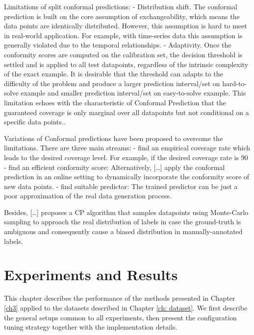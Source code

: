 \documentclass[a4paper,oneside,bibliography=totoc]{scrbook}
\begin{document}
Limitations of split conformal predictions:
- Distribution shift. The conformal prediction is built on the core assumption of exchangeability, which means the data points are identically distributed. However, this assumption is hard to meet in real-world application. For example, with time-series data this assumption is generally violated due to the temporal relationships. 
- Adaptivity. Once the conformity scores are computed on the calibration set, the decision threshold is settled and is applied to all test datapoints, regardless of the intrinsic complexity of the exact example. It is desirable that the threshold can adapts to the difficulty of the problem and produce a larger prediction interval/set on hard-to-solve example and smaller prediction interval/set on easy-to-solve example. This limitation echoes with the characteristic of Conformal Prediction that the guaranteed coverage is only marginal over all datapoints but not conditional on a specific data points..

Variations of Conformal predictions have been proposed to overcome the limitations. There are three main streams:
- find an empirical coverage rate which leads to the desired coverage level. For example, if the desired coverage rate is 90%
- find an efficient conformity score: Alternatively, […] apply the conformal prediction in an online setting to dynamically incorporate the conformity score of new data points.
- find suitable predictor: The trained predictor can be just a poor approximation of the real data generation process.

Besides, […] proposes a CP algorithm that samples datapoints using Monte-Carlo sampling to approach the real distribution of labels in case the ground-truth is ambiguous and consequently cause a biased distribution in manually-annotated labels.





% 

\chapter{Experiments and Results}
This chapter describes the performance of the methods presented in Chapter \ref{ch3}  applied to the datasets described in Chapter \ref{ch: dataset}. We first describe the general setups common to all experiments, then present the configuration tuning strategy together with the implementation details. 
\end{document}

